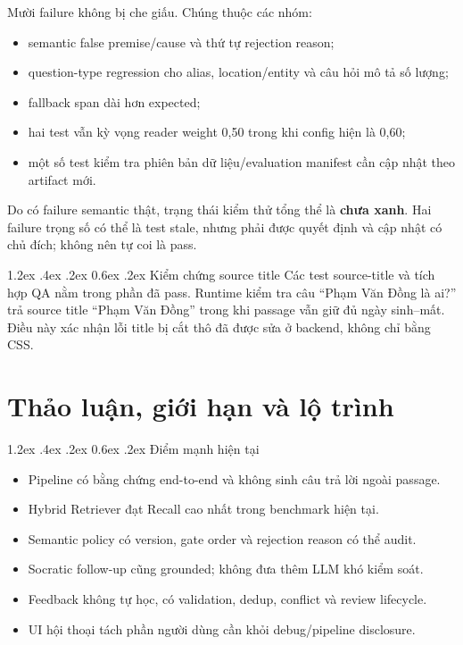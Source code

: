 \documentclass[12pt,a4paper,oneside]{report}
\makeatletter
\renewcommand\section{\@startsection {section}{1}{\z@}%
  {1.2ex \@plus .4ex \@minus .2ex}%
  {0.6ex \@plus .2ex}%
  {\normalfont\Large\bfseries}}
\makeatother
\begin{document}
Mười failure không bị che giấu. Chúng thuộc các nhóm:
\begin{itemize}
  \item semantic false premise/cause và thứ tự rejection reason;
  \item question-type regression cho alias, location/entity và câu hỏi mô tả số lượng;
  \item fallback span dài hơn expected;
  \item hai test vẫn kỳ vọng reader weight 0,50 trong khi config hiện là 0,60;
  \item một số test kiểm tra phiên bản dữ liệu/evaluation manifest cần cập nhật theo artifact mới.
\end{itemize}
Do có failure semantic thật, trạng thái kiểm thử tổng thể là \textbf{chưa xanh}. Hai
failure trọng số có thể là test stale, nhưng phải được quyết định và cập nhật có chủ
đích; không nên tự coi là pass.

\section{Kiểm chứng source title}
Các test source-title và tích hợp QA nằm trong phần đã pass. Runtime kiểm tra câu
``Phạm Văn Đồng là ai?'' trả source title ``Phạm Văn Đồng'' trong khi passage vẫn giữ
đủ ngày sinh--mất. Điều này xác nhận lỗi title bị cắt thô đã được sửa ở backend, không
chỉ bằng CSS.

\chapter{Thảo luận, giới hạn và lộ trình}
\label{chap:discussion}

\section{Điểm mạnh hiện tại}
\begin{itemize}
  \item Pipeline có bằng chứng end-to-end và không sinh câu trả lời ngoài passage.
  \item Hybrid Retriever đạt Recall cao nhất trong benchmark hiện tại.
  \item Semantic policy có version, gate order và rejection reason có thể audit.
  \item Socratic follow-up cũng grounded; không đưa thêm LLM khó kiểm soát.
  \item Feedback không tự học, có validation, dedup, conflict và review lifecycle.
  \item UI hội thoại tách phần người dùng cần khỏi debug/pipeline disclosure.
\end{itemize}
\end{document}
